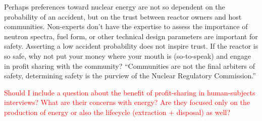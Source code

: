 \begin{enumerate}
\begin{itemize}
    Perhaps preferences toward nuclear energy are not so dependent on the probability of an accident, but
    on the trust between reactor owners and host communities. Non-experts don't have the expertise to assess
    the importance of neutron spectra, fuel form, or other technical design parameters are important for safety.
    Asserting a low accident probability does not inspire trust. If the reactor is so safe, why not put your money
    where your mouth is (so-to-speak) and engage in profit sharing with the community? 
    ``Communities are not the final arbiters of safety, determining safety is the purview of the Nuclear Regulatory Commission.''


    \textcolor{red}{Should I include a question about the benefit of profit-sharing in human-subjects interviews? 
    What are their concerns with energy? Are they focused only on the production of energy or also the lifecycle 
    (extraction + disposal) as well?}
\end{itemize}
\end{enumerate}